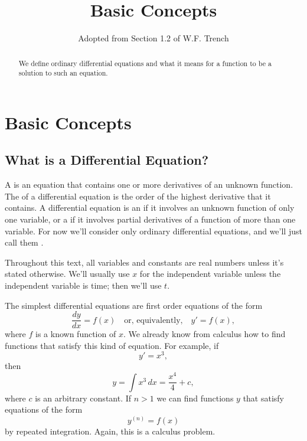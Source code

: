 \documentclass{ximera}
\title{Basic Concepts}
\author{Adopted from Section 1.2 of W.F. Trench}
\begin{document}
\begin{abstract}
We define ordinary differential equations and what it means for a function to be a solution to such an equation.
\end{abstract}

\maketitle

\section*{Basic Concepts}
\subsection*{What is a Differential Equation?}
A  is an equation that contains one or more
derivatives of an unknown function. The  of a
differential equation is the order of the highest
derivative that it contains. A differential equation is an
 if it involves an unknown
function of only one variable, or a  if it involves partial derivatives of a function of more
than one variable. For now we'll consider only ordinary differential
equations, and we'll just call them .

Throughout this text, all variables and constants are real numbers unless it's
stated otherwise. We'll usually use $x$ for the independent variable
unless the independent variable is time; then we'll use $t$.

The simplest differential equations are first order equations of the
form
$$
\frac{dy}{dx}=f(x) \quad \text{or, equivalently,} \quad y'=f(x),
$$
where $f$  is a known function of $x$. We already know from calculus
how to find functions that satisfy this kind of equation. For example,
if
$$
y'=x^3,
$$
then
$$
y=\int x^3\, dx=\frac{x^4}{4}+c,
$$
 where $c$ is an arbitrary constant.  If $n>1$
we can find functions $y$ that satisfy
equations of the form
\begin{equation} \label{eq:1.2.1}
y^{(n)}=f(x)
\end{equation}
by repeated integration. Again, this is a calculus problem.
\end{document}
